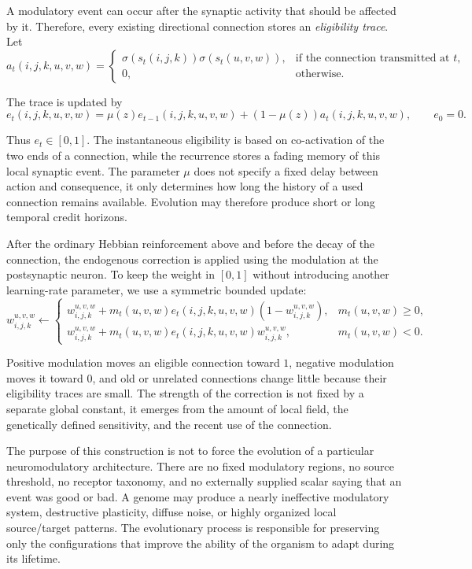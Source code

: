 \documentclass[12pt,a4paper]{article}
\begin{document}
\begin{enumerate}
	A modulatory event can occur after the synaptic activity that should be affected by it. Therefore, every existing directional connection stores an \emph{eligibility trace}. Let
	$$a_t(i,j,k,u,v,w)=\left\{\begin{array}{ll}
	\sigma\left(s_t(i,j,k)\right)\sigma\left(s_t(u,v,w)\right), & \text{if the connection transmitted at }t,\\
	0, & \text{otherwise.}
	\end{array}\right.$$
	
	The trace is updated by
	$$e_t(i,j,k,u,v,w)=\mu(z)e_{t-1}(i,j,k,u,v,w)+(1-\mu(z))a_t(i,j,k,u,v,w),\qquad e_0=0.$$
	
	Thus $e_t\in[0,1]$. The instantaneous eligibility is based on co-activation of the two ends of a connection, while the recurrence stores a fading memory of this local synaptic event. The parameter $\mu$ does not specify a fixed delay between action and consequence, it only determines how long the history of a used connection remains available. Evolution may therefore produce short or long temporal credit horizons.

	After the ordinary Hebbian reinforcement above and before the decay of the connection, the endogenous correction is applied using the modulation at the postsynaptic neuron. To keep the weight in $[0,1]$ without introducing another learning-rate parameter, we use a symmetric bounded update:
	$$w_{i,j,k}^{u,v,w}\leftarrow
	\left\{\begin{array}{ll}
	w_{i,j,k}^{u,v,w}+m_t(u,v,w)e_t(i,j,k,u,v,w)\left(1-w_{i,j,k}^{u,v,w}\right), & m_t(u,v,w)\geq0,\\[2mm]
	w_{i,j,k}^{u,v,w}+m_t(u,v,w)e_t(i,j,k,u,v,w)w_{i,j,k}^{u,v,w}, & m_t(u,v,w)<0.
	\end{array}\right.$$
	
	Positive modulation moves an eligible connection toward $1$, negative modulation moves it toward $0$, and old or unrelated connections change little because their eligibility traces are small. The strength of the correction is not fixed by a separate global constant, it emerges from the amount of local field, the genetically defined sensitivity, and the recent use of the connection.

	The purpose of this construction is not to force the evolution of a particular neuromodulatory architecture. There are no fixed modulatory regions, no source threshold, no receptor taxonomy, and no externally supplied scalar saying that an event was good or bad. A genome may produce a nearly ineffective modulatory system, destructive plasticity, diffuse noise, or highly organized local source/target patterns. The evolutionary process is responsible for preserving only the configurations that improve the ability of the organism to adapt during its lifetime.
	

\end{enumerate}
\end{document}
